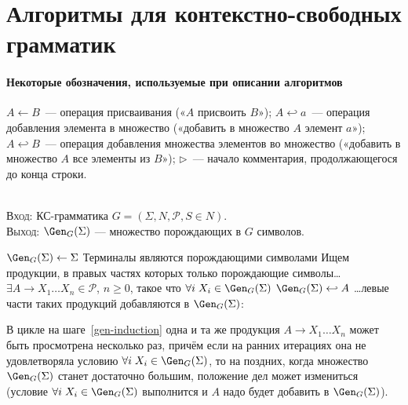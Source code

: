 % 

\cfoot{--- \thepage{} ---}
\rfoot{}

\renewcommand{\labelenumi}{\theenumi{}}

\section*{Алгоритмы для контекстно-свободных грамматик}

\paragraph{Некоторые обозначения, используемые при описании алгоритмов}
${A \gets B}$~— операция присваивания («$A$ присвоить $B$»); 
$A \hookleftarrow a$~— операция добавления элемента в множество («добавить в
множество $A$ элемент $a$»); $A \hookleftarrow B$~— операция добавления
множества элементов во множество («добавить в множество $A$ все элементы из
$B$»); ${\rhd}$~— начало комментария, продолжающегося до конца строки.

\begin{NumAlgo}\label{algo-gen}
\nspace\\
\textsc{Вход}: КС-грамматика $G=(\Sigma, N, \mathcal P, S \in N)$.\\
\textsc{Выход}: $\Gen_G(\Sigma)$  — множество
порождающих в $G$ символов.
\begin{codebox}
\li $\Gen_G(\Sigma) \gets \Sigma$ \Comment Терминалы являются порождающими
символами
\zi\Comment Ищем продукции, в правых частях которых только порождающие символы\ldots
\li \While $\exists A \to X_1 \ldots X_n \in \mathcal P$, $n \geqslant 0$, 
такое что $\forall i \; X_i \in \Gen_G(\Sigma)$  \label{gen-induction}
\zi     \Do
        $\Gen_G(\Sigma) \hookleftarrow A$ \Comment \ldots левые части таких
        продукций добавляются в $\Gen_G(\Sigma)$:
        \End
\end{codebox}

\begin{Remark}
В цикле на шаге~\ref{gen-induction} одна и та же продукция $A \to X_1 \ldots X_n$
может быть просмотрена несколько раз, причём если на ранних итерациях она не
удовлетворяла условию $\forall i \; X_i \in \Gen_G(\Sigma)$, то на поздних,
когда множество $\Gen_G(\Sigma)$ станет достаточно большим, положение дел может
измениться (условие $\forall i \; X_i \in \Gen_G(\Sigma)$ выполнится и $A$ надо
будет добавить в $\Gen_G(\Sigma)$).
\end{Remark}
\end{NumAlgo}

